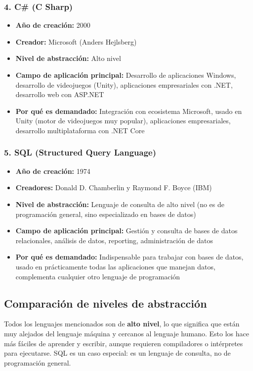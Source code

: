 \documentclass[12pt]{article}
\begin{document}
\subsubsection{4. C\# (C Sharp)}

\begin{itemize}
    \item \textbf{Año de creación:} 2000
    \item \textbf{Creador:} Microsoft (Anders Hejlsberg)
    \item \textbf{Nivel de abstracción:} Alto nivel
    \item \textbf{Campo de aplicación principal:} Desarrollo de aplicaciones Windows, desarrollo de videojuegos (Unity), aplicaciones empresariales con .NET, desarrollo web con ASP.NET
    \item \textbf{Por qué es demandado:} Integración con ecosistema Microsoft, usado en Unity (motor de videojuegos muy popular), aplicaciones empresariales, desarrollo multiplataforma con .NET Core
\end{itemize}

\subsubsection{5. SQL (Structured Query Language)}

\begin{itemize}
    \item \textbf{Año de creación:} 1974
    \item \textbf{Creadores:} Donald D. Chamberlin y Raymond F. Boyce (IBM)
    \item \textbf{Nivel de abstracción:} Lenguaje de consulta de alto nivel (no es de programación general, sino especializado en bases de datos)
    \item \textbf{Campo de aplicación principal:} Gestión y consulta de bases de datos relacionales, análisis de datos, reporting, administración de datos
    \item \textbf{Por qué es demandado:} Indispensable para trabajar con bases de datos, usado en prácticamente todas las aplicaciones que manejan datos, complementa cualquier otro lenguaje de programación
\end{itemize}

\subsection{Comparación de niveles de abstracción}

Todos los lenguajes mencionados son de \textbf{alto nivel}, lo que significa que están muy alejados del lenguaje máquina y cercanos al lenguaje humano. Esto los hace más fáciles de aprender y escribir, aunque requieren compiladores o intérpretes para ejecutarse. SQL es un caso especial: es un lenguaje de consulta, no de programación general.
\end{document}
